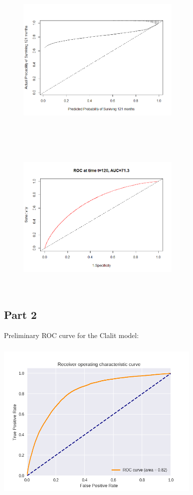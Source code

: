 \documentclass[a4paper,12pt]{article}
\begin{document}
	\begin{figure}[H]
		\begin{minipage}{.45\linewidth}
			\includegraphics[width=8cm, height=8cm]{prelim-results/FSRS/FSRScal.png}
			\label{FSRS1}
		\end{minipage}
		\hspace{.01\linewidth}
		\begin{minipage}{.45\linewidth}
			\includegraphics[width=8cm, height=8cm]{prelim-results/FSRS/FSRSdisc.png}
			\label{FSRS2}
		\end{minipage}
	\end{figure}
	
	\subsection{Part 2}
	
	Preliminary ROC curve for the Clalit model:
	
	\includegraphics[width=10cm,height=8cm]{prelim-results/Panpredictor/ROCCurve.png}
	
\end{document}
